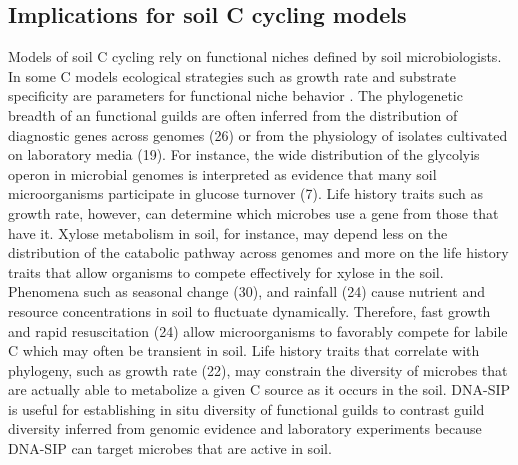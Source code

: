 \subsection{Implications for soil C cycling models}
Models of soil C cycling rely on functional niches defined by soil
microbiologists. In some C models ecological strategies such as growth rate and
substrate specificity are parameters for functional niche behavior
\citep{Kaiser2014a}. The phylogenetic breadth of an functional guilds are often
inferred from the distribution of diagnostic genes across genomes (26) or from
the physiology of isolates cultivated on laboratory media (19). For instance,
the wide distribution of the glycolyis operon in microbial genomes is
interpreted as evidence that many soil microorganisms participate in glucose
turnover (7). Life history traits such as growth rate, however, can determine
which microbes use a gene from those that have it. Xylose metabolism in soil,
for instance, may depend less on the distribution of the catabolic pathway
across genomes and more on the life history traits that allow organisms to
compete effectively for xylose in the soil. Phenomena such as seasonal change
(30), and rainfall (24) cause nutrient and resource concentrations in soil to
fluctuate dynamically. Therefore, fast growth and rapid resuscitation (24)
allow microorganisms to favorably compete for labile C which may often be
transient in soil. Life history traits that correlate with phylogeny, such as
growth rate (22), may constrain the diversity of microbes that are actually
able to metabolize a given C source as it occurs in the soil. DNA-SIP is useful
for establishing in situ diversity of functional guilds to contrast guild
diversity inferred from genomic evidence and laboratory experiments because
DNA-SIP can target microbes that are active in soil. 

